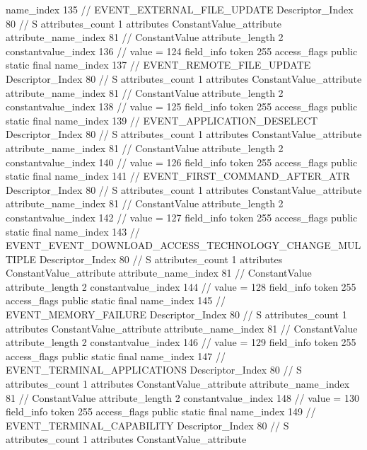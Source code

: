 {{{{{				name_index	135		// EVENT_EXTERNAL_FILE_UPDATE
				Descriptor_Index	80		// S
				attributes_count	1
				attributes {
				ConstantValue_attribute {
					attribute_name_index	81		// ConstantValue
					attribute_length	2
					constantvalue_index	136		// value = 124
				}
				}
			}
			field_info {
				token	255
				access_flags	public static final
				name_index	137		// EVENT_REMOTE_FILE_UPDATE
				Descriptor_Index	80		// S
				attributes_count	1
				attributes {
				ConstantValue_attribute {
					attribute_name_index	81		// ConstantValue
					attribute_length	2
					constantvalue_index	138		// value = 125
				}
				}
			}
			field_info {
				token	255
				access_flags	public static final
				name_index	139		// EVENT_APPLICATION_DESELECT
				Descriptor_Index	80		// S
				attributes_count	1
				attributes {
				ConstantValue_attribute {
					attribute_name_index	81		// ConstantValue
					attribute_length	2
					constantvalue_index	140		// value = 126
				}
				}
			}
			field_info {
				token	255
				access_flags	public static final
				name_index	141		// EVENT_FIRST_COMMAND_AFTER_ATR
				Descriptor_Index	80		// S
				attributes_count	1
				attributes {
				ConstantValue_attribute {
					attribute_name_index	81		// ConstantValue
					attribute_length	2
					constantvalue_index	142		// value = 127
				}
				}
			}
			field_info {
				token	255
				access_flags	public static final
				name_index	143		// EVENT_EVENT_DOWNLOAD_ACCESS_TECHNOLOGY_CHANGE_MULTIPLE
				Descriptor_Index	80		// S
				attributes_count	1
				attributes {
				ConstantValue_attribute {
					attribute_name_index	81		// ConstantValue
					attribute_length	2
					constantvalue_index	144		// value = 128
				}
				}
			}
			field_info {
				token	255
				access_flags	public static final
				name_index	145		// EVENT_MEMORY_FAILURE
				Descriptor_Index	80		// S
				attributes_count	1
				attributes {
				ConstantValue_attribute {
					attribute_name_index	81		// ConstantValue
					attribute_length	2
					constantvalue_index	146		// value = 129
				}
				}
			}
			field_info {
				token	255
				access_flags	public static final
				name_index	147		// EVENT_TERMINAL_APPLICATIONS
				Descriptor_Index	80		// S
				attributes_count	1
				attributes {
				ConstantValue_attribute {
					attribute_name_index	81		// ConstantValue
					attribute_length	2
					constantvalue_index	148		// value = 130
				}
				}
			}
			field_info {
				token	255
				access_flags	public static final
				name_index	149		// EVENT_TERMINAL_CAPABILITY
				Descriptor_Index	80		// S
				attributes_count	1
				attributes {
				ConstantValue_attribute {
}}}}}}}
